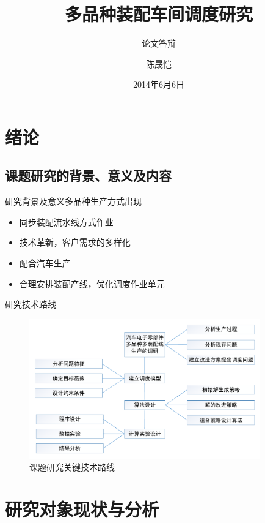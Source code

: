 \documentclass{beamer}
\title{多品种装配车间调度研究}
\subtitle{论文答辩}
\author{陈晟恺}
\institute[diufanshu@gmail.com]{健行理工1001~~201002750102\\ 指导老师：鲁建厦、董巧英 }
\date{2014年6月6日}
\begin{document}
\newtheorem{thm}{定理}
\begin{frame}
\titlepage
{}
\end{frame}
\section{绪论}
\subsection{课题研究的背景、意义及内容}
\begin{frame}{研究背景及意义}{多品种生产方式出现}
\begin{itemize}[<+-| alert@+>]
\item 同步装配流水线方式作业
\item 技术革新，客户需求的多样化
\item 配合汽车生产
\item 合理安排装配产线，优化调度作业单元
\end{itemize}
\end{frame}

\begin{frame}{研究技术路线}
\begin{figure}
\centering
\includegraphics[width = 10cm]{techroute1.pdf}
\caption{课题研究关键技术路线}
\end{figure}
\end{frame}

\section{研究对象现状与分析}
\end{document}
